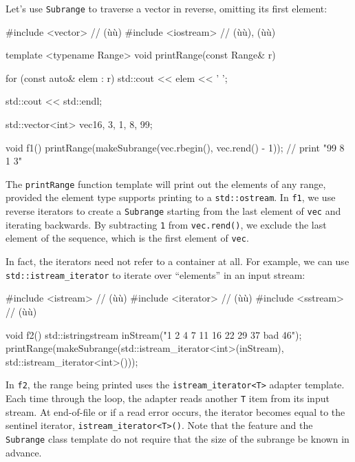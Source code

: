 {{Let's use \lstinline!Subrange! to traverse a vector in reverse, omitting
its first element:

\begin{emcppslisting}
#include <vector>    // (ù{}ù)
#include <iostream>  // (ù{}ù), (ù{}ù)

template <typename Range>
void printRange(const Range& r)
{
    for (const auto& elem : r)
    {
        std::cout << elem << ' ';
    }

    std::cout << std::endl;
}

std::vector<int> vec{16, 3, 1, 8, 99};

void f1()
{
    printRange(makeSubrange(vec.rbegin(), vec.rend() - 1));
        // print "99 8 1 3"
}
\end{emcppslisting}
    

\noindent The \lstinline!printRange! function template will print out the elements of
any range, provided the element type supports printing to a
\lstinline!std::ostream!. In \lstinline!f1!, we use reverse iterators to
create a \lstinline!Subrange! starting from the last element of
\lstinline!vec! and iterating backwards. By subtracting \lstinline!1! from
\lstinline!vec.rend()!, we exclude the last element of the sequence, which
is the first element of \lstinline!vec!.

In fact, the iterators need not refer to a container at all. For
example, we can use \lstinline!std::istream_iterator! to iterate over
``elements'' in an input stream:

\begin{emcppslisting}
#include <istream>   // (ù{}ù)
#include <iterator>  // (ù{}ù)
#include <sstream>   // (ù{}ù)

void f2()
{
    std::istringstream inStream("1 2 4 7 11 16 22 29 37 bad 46");
    printRange(makeSubrange(std::istream_iterator<int>(inStream),
                            std::istream_iterator<int>()));
}
\end{emcppslisting}
    

\noindent In \lstinline!f2!, the range being printed uses the
\lstinline!istream_iterator<T>! adapter template. Each time through the
loop, the adapter reads another \lstinline!T! item from its input stream.
At end-of-file or if a read error occurs, the iterator becomes equal to
the sentinel iterator, \lstinline!istream_iterator<T>()!. Note that the
 feature and the \lstinline!Subrange!
class template do not require that the size of the subrange be known in
advance.

}}
